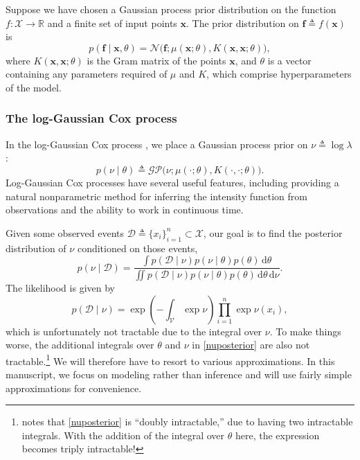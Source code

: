 \documentclass{article}
\newcommand{\deq}{\triangleq}
\newcommand{\cm}[1]{\mathcal{#1}}
\newcommand{\data}{\cm{D}}
\newcommand{\given}{\mid}
\newcommand{\R}{\mathbb{R}}
\newcommand{\intd}[1]{\,\mathrm{d}#1}
\begin{document}
Suppose we have chosen a Gaussian process prior distribution on the
function $f\colon \cm{X} \to \R$ and a finite set of input points
$\bm{x}$.  The prior distribution on $\bm{f} \deq f(\bm{x})$ is
\begin{equation*}
 p(\bm{f} \given \bm{x}, \theta)
 =
 \cm{N}
 \bigl(
   \bm{f};
   \mu(\bm{x}; \theta),
   K(\bm{x}, \bm{x}; \theta)
 \bigr),
\end{equation*}
where $K(\bm{x}, \bm{x}; \theta)$ is the Gram matrix of the points
$\bm{x}$, and $\theta$ is a vector containing any parameters required
of $\mu$ and $K$, which comprise hyperparameters of the model.

\subsubsection{The log-Gaussian Cox process}

In the log-Gaussian Cox process \citep{moller, diggle}, we place a
Gaussian process prior on $\nu \deq \log \lambda$:
\begin{equation*}
  p(\nu \given \theta) 
  \deq 
  \cm{GP}\bigl(\nu; \mu(\cdot; \theta), K(\cdot, \cdot; \theta)\bigr).
\end{equation*}
Log-Gaussian Cox processes have several useful features, including
providing a natural nonparametric method for inferring the intensity
function from observations and the ability to work in continuous time.

Given some observed events $\data \deq \lbrace x_i \rbrace_{i=1}^n
\subset \cm{X}$, our goal is to find the posterior distribution of
$\nu$ conditioned on those events,
\begin{equation}
  \label{nuposterior}
  p(\nu \given \data)
  =
  \frac
  {
    \int p(\data \given \nu)
    p(\nu \given \theta)
    p(\theta) \intd{\theta}
  }
  {
    \iint p(\data \given \nu)
    p(\nu \given \theta) 
    p(\theta) 
    \intd{\theta} \intd{\nu}
  }.
\end{equation}
The likelihood is given by
\begin{equation}
  \label{hard}
  p(\data \given \nu) 
  =
  \exp\left( -\int_{\cm{V}} \exp \nu \right) \prod_{i = 1}^n \exp \nu(x_i),
\end{equation}
which is unfortunately not tractable due to the integral over $\nu$.
To make things worse, the additional integrals over $\theta$ and $\nu$
in \eqref{nuposterior} are also not tractable.\footnote{\citep{adams}
  notes that \eqref{nuposterior} is ``doubly intractable,'' due to
  having two intractable integrals.  With the addition of the integral
  over $\theta$ here, the expression becomes triply intractable!}  We
will therefore have to resort to various approximations.  In this
manuscript, we focus on modeling rather than inference and will use
fairly simple approximations for convenience.
\end{document}
